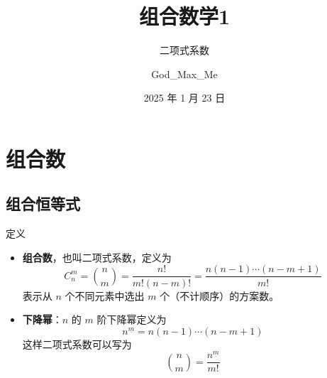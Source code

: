 \documentclass[UTF8]{beamer}
\title{组合数学1}
\subtitle{二项式系数}
\author{God\_Max\_Me}
\date{2025 年 1 月 23 日}
\begin{document}
    \maketitle
    \section{组合数}
    \subsection{组合恒等式}
    \begin{frame}{定义}
        \begin{itemize}
            \item \textbf{组合数}，也叫二项式系数，定义为
            $$
            C_{n}^{m}=\binom{n}{m}=\frac{n!}{m!(n-m)!}=\frac{n(n-1)\cdots(n-m+1)}{m!}
            $$
            表示从 $n$ 个不同元素中选出 $m$ 个（不计顺序）的方案数。
            \item \textbf{下降幂}：$n$ 的 $m$ 阶下降幂定义为
            $$
            n^{\underline m} = n(n-1)\cdots (n-m+1)
            $$
            这样二项式系数可以写为
            $$
            \binom{n}{m} = \frac{n^{\underline m}}{m!}
            $$
        \end{itemize}
    
    \end{frame}
\end{document}
